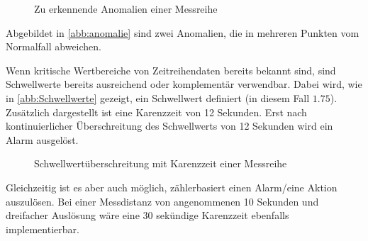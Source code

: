 \begin{figure}[H]
\centering
{}
\caption{Zu erkennende Anomalien einer Messreihe}
\label{abb:anomalie}
\end{figure}
Abgebildet in \autoref{abb:anomalie} sind zwei Anomalien, die in mehreren Punkten vom Normalfall abweichen.

Wenn kritische Wertbereiche von Zeitreihendaten bereits bekannt sind, sind Schwellwerte bereits ausreichend oder komplementär verwendbar. Dabei wird, wie in \autoref{abb:Schwellwerte} gezeigt, ein Schwellwert definiert (in diesem Fall $1.75$). Zusätzlich dargestellt ist eine Karenzzeit von 12 Sekunden. Erst nach kontinuierlicher Überschreitung des Schwellwerts von 12 Sekunden wird ein Alarm ausgelöst. 
\begin{figure}[H]
\centering
{}
\caption{Schwellwertüberschreitung mit Karenzzeit einer Messreihe}
\label{abb:Schwellwerte}
\end{figure}
Gleichzeitig ist es aber auch möglich, zählerbasiert einen Alarm/eine Aktion auszulösen. Bei einer Messdistanz von angenommenen 10 Sekunden und dreifacher Auslösung wäre eine 30 sekündige Karenzzeit ebenfalls implementierbar.


